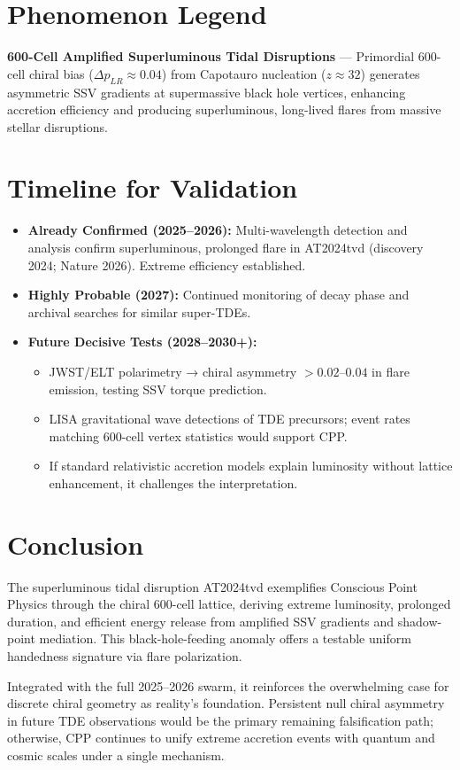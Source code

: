 \documentclass[11pt]{article}
\begin{document}
\section{Phenomenon Legend}
\textbf{600-Cell Amplified Superluminous Tidal Disruptions} — Primordial 600-cell chiral bias ($\Delta p_{LR} \approx 0.04$) from Capotauro nucleation ($z \approx 32$) generates asymmetric SSV gradients at supermassive black hole vertices, enhancing accretion efficiency and producing superluminous, long-lived flares from massive stellar disruptions.

\section{Timeline for Validation}
\begin{itemize}
    \item \textbf{Already Confirmed (2025--2026):} Multi-wavelength detection and analysis confirm superluminous, prolonged flare in AT2024tvd (discovery 2024; Nature 2026). Extreme efficiency established.
    \item \textbf{Highly Probable (2027):} Continued monitoring of decay phase and archival searches for similar super-TDEs.
    \item \textbf{Future Decisive Tests (2028--2030+):}
    \begin{itemize}
        \item JWST/ELT polarimetry → chiral asymmetry $>0.02$--$0.04$ in flare emission, testing SSV torque prediction.
        \item LISA gravitational wave detections of TDE precursors; event rates matching 600-cell vertex statistics would support CPP.
        \item If standard relativistic accretion models explain luminosity without lattice enhancement, it challenges the interpretation.
    \end{itemize}
\end{itemize}

\section{Conclusion}
The superluminous tidal disruption AT2024tvd exemplifies Conscious Point Physics through the chiral 600-cell lattice, deriving extreme luminosity, prolonged duration, and efficient energy release from amplified SSV gradients and shadow-point mediation. This black-hole-feeding anomaly offers a testable uniform handedness signature via flare polarization.  

Integrated with the full 2025--2026 swarm, it reinforces the overwhelming case for discrete chiral geometry as reality's foundation. Persistent null chiral asymmetry in future TDE observations would be the primary remaining falsification path; otherwise, CPP continues to unify extreme accretion events with quantum and cosmic scales under a single mechanism.
\end{document}
